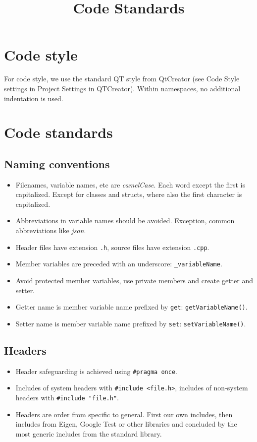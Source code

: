 \documentclass{article}
\title{Code Standards}
\begin{document}
\maketitle

\section{Code style}
For code style, we use the standard QT style from QtCreator (see Code Style settings in Project Settings in QTCreator). Within namespaces, no additional indentation is used.

\section{Code standards}

\subsection{Naming conventions}
\begin{itemize}
 \item Filenames, variable names, etc  are \textit{camelCase}. Each word except the first is capitalized. Except for classes and structs, where also the first character is capitalized.
 \item Abbreviations in variable names should be avoided. Exception, common abbreviations like \textit{json}.
 \item Header files have extension \verb|.h|, source files have extension \verb|.cpp|.
 \item Member variables are preceded with an underscore: \verb|_variableName|.
 \item Avoid protected member variables, use private members and create getter and setter.
 \item Getter name is member variable name prefixed by \verb|get|: \verb|getVariableName()|.
 \item Setter name is member variable name prefixed by \verb|set|: \verb|setVariableName()|.
\end{itemize}

\subsection{Headers}
\begin{itemize}
 \item Header safeguarding is achieved using \verb|#pragma once|.
 \item Includes of system headers with \verb|#include <file.h>|, includes of non-system headers with \verb|#include "file.h"|.
 \item Headers are order from specific to general. First our own includes, then includes from Eigen, Google Test or other libraries and concluded by the most generic includes from the standard library.
\end{itemize}
\end{document}
